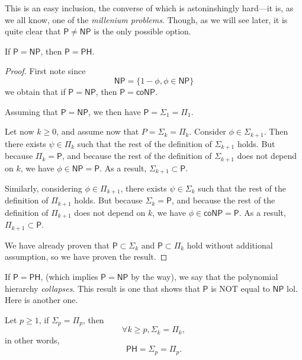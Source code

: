 This is an easy inclusion, the converse of which is astoninshingly hard---it is, as we all know, one of the \textit{millenium problems}. Though, as we will see later, it is quite clear that $ \mathsf P \neq \mathsf{NP} $ is the only possible option.

\begin{proposition}
    If $ \mathsf P = \mathsf{NP} $, then $ \mathsf P = \mathsf{PH} $.
\end{proposition}

\begin{proof}
    First note since
    \[
        \mathsf{NP} = \{ 1 - \phi, \phi \in \mathsf{NP} \}
    \]
    we obtain that if $ \mathsf P = \mathsf{NP} $, then $ \mathsf P = \mathsf{coNP} $.

    Assuming that $ \mathsf P = \mathsf{NP} $, we then have $ \mathsf P = \mathsf \Sigma_1 = \mathsf \Pi_1 $.

    Let now $ k \ge 0 $, and assume now that $ P = \mathsf \Sigma_k = \mathsf \Pi_k $. Consider $ \phi \in \mathsf \Sigma_{k+1} $. Then there exists $ \psi \in \mathsf \Pi_k $ such that the rest of the definition of $ \mathsf \Sigma_{k+1} $ holds. But because $ \mathsf \Pi_k = \mathsf P $, and because the rest of the definition of $ \Sigma_{k+1} $ does not depend on $ k $, we have $ \phi \in \mathsf{NP} = \mathsf P $. As a result, $ \mathsf \Sigma_{k+1} \subset \mathsf P $. 

    Similarly, considering $ \phi \in \mathsf \Pi_{k+1} $, there exists $ \psi \in \mathsf \Sigma_k $ such that the rest of the definition of $ \mathsf \Pi_{k+1} $ holds. But because $ \mathsf \Sigma_k = \mathsf P $, and because the rest of the definition of $ \Pi_{k+1} $ does not depend on $ k $, we have $ \phi \in \mathsf{coNP} = \mathsf P $. As a result, $ \mathsf \Pi_{k+1} \subset \mathsf P $.

    We have already proven that $ \mathsf P \subset \mathsf \Sigma_k $ and $ \mathsf P \subset \mathsf \Pi_k $ hold without additional assumption, so we have proven the result.
\end{proof}

If $ \mathsf P = \mathsf{PH} $, (which implies $ \mathsf{P} = \mathsf{NP} $ by the way), we say that the polynomial hierarchy \textit{collapses}. This result is one that \og shows \fg that $ \mathsf P $ is NOT equal to $ \mathsf{NP} $ lol. Here is another one.

\begin{proposition}
    Let $ p \ge 1 $, if $ \mathsf \Sigma_p = \mathsf \Pi_p $, then
    \[
        \forall k \ge p, \mathsf \Sigma_k = \mathsf \Pi_k,
    \]
    in other words,
    \[
        \mathsf{PH} = \mathsf \Sigma_p = \mathsf \Pi_p.
    \]
\end{proposition}

